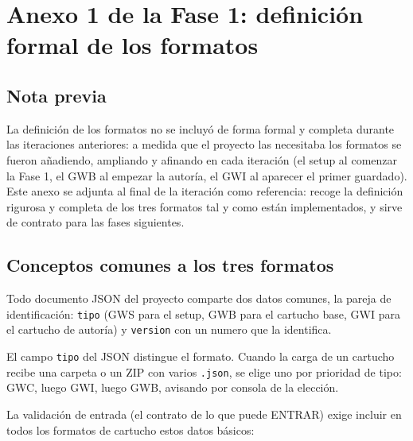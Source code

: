 \section*{Anexo 1 de la Fase 1: definición formal de los formatos}
\label{sec:F1A01}

\subsection*{Nota previa}
\label{sec:F1A01Nota}

La definición de los formatos no se incluyó de forma formal y
completa durante las iteraciones anteriores: a medida que el proyecto las
necesitaba los formatos se fueron añadiendo, ampliando y afinando en cada iteración
(el setup al comenzar la Fase 1, el GWB al empezar la autoría, el GWI al aparecer el primer guardado). Este anexo se adjunta al final de la iteración como referencia:
recoge la definición rigurosa y completa de los tres formatos tal y como están
implementados, y sirve de contrato para las fases siguientes.

\subsection*{Conceptos comunes a los tres formatos}
\label{sec:F1A01Comun}

Todo documento JSON del proyecto comparte dos datos comunes, la pareja de
identificación: \texttt{tipo} (GWS para el setup, GWB para el cartucho base, GWI para el 
cartucho de autoría) y \texttt{version} con un numero que la identifica. 

El campo \texttt{tipo} del JSON distingue el
formato. Cuando la carga de un cartucho recibe una carpeta o un ZIP con varios
\texttt{.json}, se elige uno por prioridad de tipo: GWC, luego GWI, luego
GWB, avisando por consola de la elección.

La validación de entrada (el contrato de lo que puede ENTRAR) exige incluir en todos los 
formatos de cartucho estos datos básicos:

